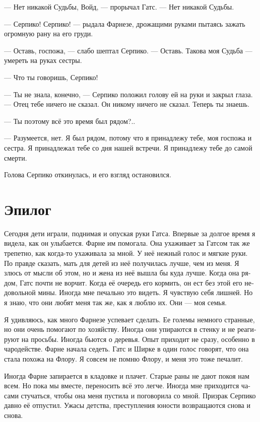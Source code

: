 \documentclass[a4paper,12pt,fleqn]{book}\usepackage{polyglossia}\setdefaultlanguage[babelshorthands=true]{russian}\setotherlanguage{english}\defaultfontfeatures{Ligatures=TeX,Mapping=tex-text}\usepackage{xcolor}\newcommand{\ml}[3]{#2}
\begin{document}
--- Нет никакой Судьбы, Войд, --- прорычал Гатс.
--- Нет никакой Судьбы.

--- Серпико!
Серпико! --- рыдала Фарнезе, дрожащими руками пытаясь зажать огромную рану на его груди.

--- Оставь, госпожа, --- слабо шептал Серпико.
--- Оставь.
Такова моя Судьба --- умереть на руках сестры.

--- Что ты говоришь, Серпико!

--- Ты не знала, конечно, --- Серпико положил голову ей на руки и закрыл глаза.
--- Отец тебе ничего не сказал.
Он никому ничего не сказал.
Теперь ты знаешь.

--- Ты поэтому всё это время был рядом?..

--- Разумеется, нет.
Я был рядом, потому что я принадлежу тебе, моя госпожа и сестра.
Я принадлежал тебе со дня нашей встречи.
Я принадлежу тебе до самой смерти.

Голова Серпико откинулась, и его взгляд остановился.

\section{Эпилог}

Сегодня дети играли, поднимая и опуская руки Гатса.
Впервые за долгое время я видела, как он улыбается.
Фарне им помогала.
Она ухаживает за Гатсом так же трепетно, как когда-то ухаживала за мной.
У неё нежный голос и мягкие руки.
По правде сказать, мать для детей из неё получилась лучше, чем из меня.
Я злюсь от мысли об этом, но и жена из неё вышла бы куда лучше.
Когда она рядом, Гатс почти не ворчит.
Когда её очередь его кормить, он ест без этой его недовольной мины.
Иногда мне печально это видеть.
Я чувствую себя лишней.
Но я знаю, что они любят меня так же, как я люблю их.
Они --- моя семья.

Я удивляюсь, как много Фарнезе успевает сделать.
Ее големы немного странные, но они очень помогают по хозяйству.
Иногда они упираются в стенку и не реагируют на просьбы.
Иногда бьются о деревья.
Опыт приходит не сразу, особенно в чародействе.
Фарне начала седеть.
Гатс и Ширке в один голос говорят, что она стала похожа на Флору.
Я совсем не помню Флору, и меня это тоже печалит.

Иногда Фарне запирается в кладовке и плачет.
Старые раны не дают покоя нам всем.
Но пока мы вместе, переносить всё это легче.
Иногда мне приходится часами стучаться, чтобы она меня пустила и поговорила со мной.
Призрак Серпико давно её отпустил.
Ужасы детства, преступления юности возвращаются снова и снова.
\end{document}
